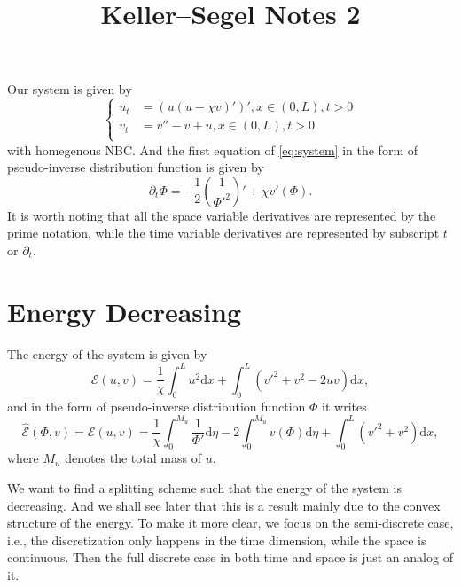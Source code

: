 \documentclass{article}
\title{Keller--Segel Notes 2}
\def\diff{\mathrm d}
\begin{document}
Our system is given by
\begin{equation}
  \label{eq:system}
  \left\{
  \begin{aligned}
    u_t & = (u(u - \chi v)')', x \in (0, L), t > 0 \\
    v_t & = v'' - v + u, x \in (0, L), t > 0       \\
  \end{aligned}
  \right.
\end{equation}
with homegenous NBC.
And the first equation of \cref{eq:system} in the form of pseudo-inverse distribution
function is given by
\begin{equation}
  \partial_t\Phi = -\frac12\left(\frac1{\Phi'^2}\right)'+\chi v'(\Phi).
\end{equation}
It is worth noting that all the space variable derivatives are represented by the prime notation,
while the time variable derivatives are represented by subscript $t$ or $\partial_t$.

\section{Energy Decreasing}
The energy of the system is given by
\begin{equation}
  \label{eq:energy}
  \mathcal E(u, v) = \frac 1\chi \int_0^L u^2\diff x + \int_0^L(v'^2 + v^2 - 2uv)\diff x,
\end{equation}
and in the form of pseudo-inverse distribution function $\Phi$ it writes
\def\hatE{\hat{\mathcal E}}
\begin{equation}
  \hat{\mathcal E}(\Phi, v) = \mathcal E(u, v) =
  \frac 1\chi \int_0^{M_u} \frac 1{\Phi'}\diff\eta
  - 2\int_0^{M_u} v(\Phi)\diff\eta
  + \int_0^L (v'^2 + v^2)\diff x,
\end{equation}
where $M_u$ denotes the total mass of $u$.

We want to find a splitting scheme such that the energy of the system is decreasing.
And we shall see later that this is a result mainly due to the convex structure of the
energy. To make it more clear, we focus on the semi-discrete case, i.e., the discretization
only happens in the time dimension, while the space is continuous. Then the full discrete case
in both time and space is just an analog of it.
\end{document}
